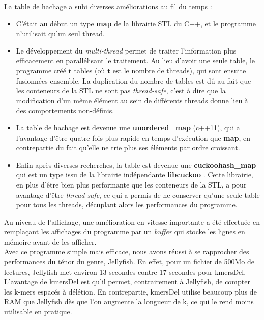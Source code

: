 \documentclass{report}
\begin{document}
      La table de hachage a subi diverses améliorations au fil du temps :\\
      \begin{itemize}
        \item C'était au début un type \textbf{map} de la librairie STL du C++, et le programme n'utilisait qu'un seul thread.\\
        \item Le développement du \textit{multi-thread} permet de traiter l'information plus efficacement en parallélisant le traitement. Au lieu d'avoir une seule table, le programme créé $\mathbf{t}$ tables (où $\mathbf{t}$ est le nombre de threads), qui sont ensuite fusionnées ensemble. La duplication du nombre de tables est dû au fait que les conteneurs de la STL ne sont pas \textit{thread-safe}, c'est à dire que la modification d'un même élément au sein de différents threads donne lieu à des comportements non-définis.\\
        \item La table de hachage est devenue une \textbf{unordered\_map} (c++11), qui a l'avantage d'être quatre fois plus rapide en temps d'exécution que \textbf{map}, en contrepartie du fait qu'elle ne trie plus ses éléments par ordre croissant.\\
        \item Enfin après diverses recherches, la table est devenue une \textbf{cuckoohash\_map} qui est un type issu de la librairie indépendante \textbf{libcuckoo} \cite{Cuckoo2013} \cite{Cuckoo2014}. Cette librairie, en plus d'être bien plus performante que les conteneurs de la STL, a pour avantage d'être \textit{thread-safe}, ce qui a permis de ne conserver qu'une seule table pour tous les threads, décuplant alors les performances du programme.
      \end{itemize}\bigskip

      Au niveau de l'affichage, une amélioration en vitesse importante a été effectuée en remplaçant les affichages du programme par un \textit{buffer} qui stocke les lignes en mémoire avant de les afficher.\\

      Avec ce programme simple mais efficace, nous avons réussi à se rapprocher des performances du ténor du genre, Jellyfish. En effet, pour un fichier de 500Mo de lectures, Jellyfish met environ 13 secondes contre 17 secondes pour kmersDel. L'avantage de kmersDel est qu'il permet, contrairement à Jellyfish, de compter les k-mers espacés à délétion. En contrepartie, kmersDel utilise beaucoup plus de RAM que Jellyfish dès que l'on augmente la longueur de k, ce qui le rend moins utilisable en pratique.\\
\end{document}
